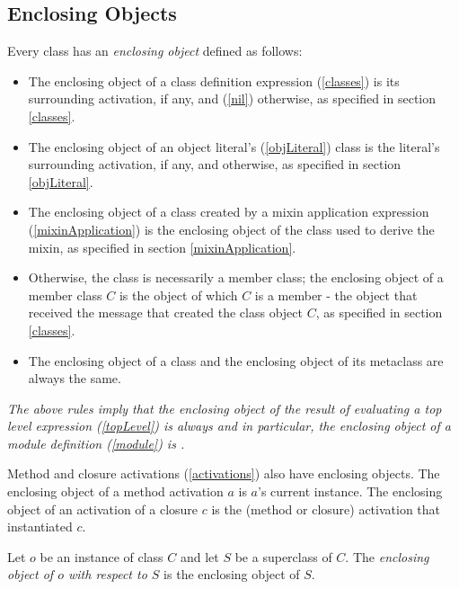 \documentclass{article}
\begin{document}
\subsection{Enclosing Objects}
\label{enclosing}

Every class has an {\em enclosing object} defined as follows:
\begin{itemize}
\item The enclosing object of a class definition expression (\ref{classes}) is its surrounding activation, if any, and \NIL{} (\ref{nil}) otherwise, as specified in section \ref{classes}. 

\item The enclosing object of an object literal's (\ref{objLiteral}) class is the literal's surrounding activation, if any, and \NIL{} otherwise, as specified in section \ref{objLiteral}.

\item The enclosing object of a class created by a mixin application expression (\ref{mixinApplication}) is the enclosing object of the class used to derive the mixin, as specified in section \ref{mixinApplication}. 

\item Otherwise, the class is necessarily a member class;  the enclosing object of a member class $C$ is the object of which $C$ is a member - the object that received the message that created the class object $C$, as specified in section \ref{classes}.  

\item The enclosing object of a class and the enclosing object of its metaclass are always the same.
\end{itemize}

{\it The above rules imply  that  the enclosing object of the result of evaluating a top level expression  (\ref{topLevel}) is always \NIL{} and in particular, the enclosing object of a module definition (\ref{module}) is \NIL{}. 
}

Method and closure activations  (\ref{activations}) also have enclosing objects.  The enclosing object of a method activation $a$ is $a$'s current instance. The enclosing object of an activation of a  closure $c$ is the (method or closure) activation that instantiated $c$. 

Let $o$ be an instance of class $C$ and let $S$ be a superclass of $C$. The {\em enclosing object of  $o$ with respect to  $S$} is the enclosing object of $S$. 

\end{document}
